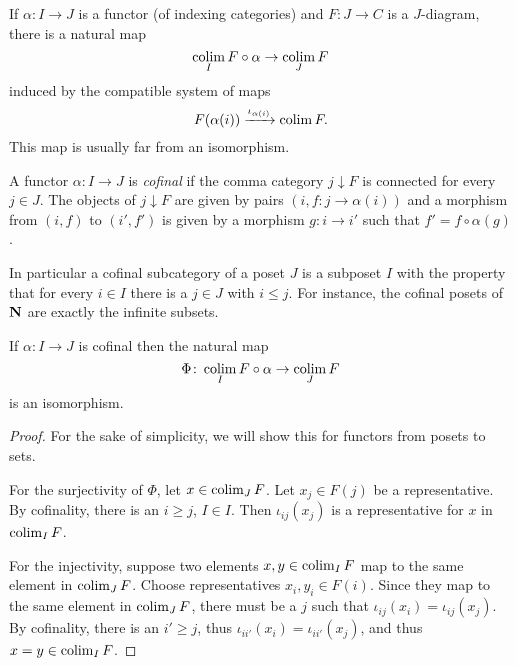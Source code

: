 \documentclass[a4paper,openany]{scrbook}
\begin{document}
If $\alpha\colon I \to J$ is a functor (of indexing categories) and $F\colon J \to C$ is a $J$-diagram, there is a natural map
\[
\operatorname*{colim}_I F\circ \alpha \to \operatorname*{colim}_J F
\]
induced by the compatible system of maps
\[
F(\alpha(i)) \xrightarrow{\iota_{\alpha(i)}} \operatorname*{colim} F.
\]
This map is usually far from an isomorphism.

\begin{defn}
A functor $\alpha\colon I \to J$ is \emph{cofinal} if the comma category $j \downarrow F$ is connected for every $j \in J$. The objects of $j \downarrow F$ are given by pairs $(i,f\colon j \to \alpha(i))$ and a morphism from $(i,f)$ to $(i',f')$ is given by a morphism $g\colon i \to i'$ such that $f'=f\circ\alpha(g)$.
\end{defn}

In particular a cofinal subcategory of a poset $J$ is a subposet $I$ with the property that for every $i \in I$ there is a $j \in J$ with $i \leq j$. For instance, the cofinal posets of $\mathbf{N}$ are exactly the infinite subsets.

\begin{lemma}\label{lemma:cofinality}
If $\alpha \colon I \to J$ is cofinal then the natural map
\[
\Phi\colon \operatorname*{colim}_I F\circ \alpha \to \operatorname*{colim}_J F
\]
is an isomorphism.
\end{lemma}
\begin{proof}
For the sake of simplicity, we will show this for functors from posets to sets.

For the surjectivity of $\Phi$, let $x \in \operatorname*{colim}_J F$. Let $x_j \in F(j)$ be a representative. By cofinality, there is an $i \geq j$, $I \in I$. Then $\iota_{ij}(x_j)$ is a representative for $x$ in $\operatorname*{colim}_I F$.

For the injectivity, suppose two elements $x,y \in \operatorname*{colim}_I F$ map to the same element in $\operatorname*{colim}_J F$. Choose representatives $x_i,y_i \in F(i)$. Since they map to the same element in $\operatorname*{colim}_J F$, there must be a $j$ such that $\iota_{ij}(x_i)=\iota_{ij}(x_j)$. By cofinality, there is an $i'\geq j$, thus $\iota_{ii'}(x_i)=\iota_{ii'}(x_j)$, and thus $x=y \in \operatorname*{colim}_I F$. 
\end{proof}
\end{document}
